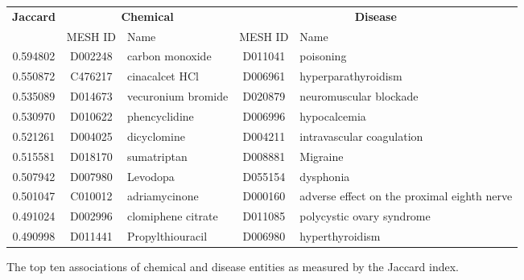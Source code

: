 \documentclass[10pt, oneside]{article}
\begin{document}
\begin{figure}[h]
\begin{center}
\fontsize{9}{11}\selectfont
\begin{tabular}{|*{2}{c|}p{4.5cm}|c|p{4.5cm}|}\hline
 \multirow{2}{*}{\textbf{Jaccard}} & \multicolumn{2}{c|}{\textbf{Chemical}} & \multicolumn{2}{c|}{\textbf{Disease}} \\ \cline{2-5}
 & MESH ID   & Name                      & MESH ID   & Name                         \\ \hline
        0.594802 & D002248   & carbon monoxide    & D011041   & poisoning                                   \\ \hline
        0.550872 & C476217   & cinacalcet HCl     & D006961   & hyperparathyroidism                         \\ \hline
        0.535089 & D014673   & vecuronium bromide & D020879   & neuromuscular blockade                      \\ \hline
        0.530970  & D010622   & phencyclidine      & D006996   & hypocalcemia                                \\ \hline
        0.521261 & D004025   & dicyclomine        & D004211   & intravascular coagulation                   \\ \hline
        0.515581 & D018170   & sumatriptan        & D008881   & Migraine                                    \\ \hline
        0.507942 & D007980   & Levodopa           & D055154   & dysphonia                                   \\ \hline
        0.501047 & C010012   & adriamycinone      & D000160   & adverse effect on the proximal eighth nerve \\ \hline
        0.491024 & D002996   & clomiphene citrate & D011085   & polycystic ovary syndrome                   \\ \hline
        0.490998 & D011441   & Propylthiouracil   & D006980   & hyperthyroidism                             \\ \hline
\end{tabular}
\caption{\label{fig:jaccard} The top ten associations of chemical and disease entities as measured by the Jaccard index.}
\end{center}
\end{figure}
\end{document}
